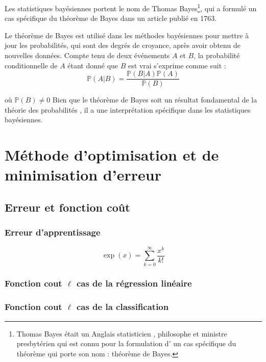 		Les statistiques bayésiennes portent le nom de Thomas Bayes\footnote{Thomas Bayes était un Anglais statisticien , philosophe et ministre presbytérien qui est connu pour la formulation d' un cas spécifique du théorème qui porte son nom : théorème de Bayes.}, qui a formulé un cas spécifique du théorème de Bayes dans un article publié en 1763.
		
		
		
		\begin{thm} Le théorème de Bayes est utilisé dans les méthodes bayésiennes pour mettre à jour les probabilités, qui sont des degrés de croyance, après avoir obtenu de nouvelles données. Compte tenu de deux événements $A$  et $B$, la probabilité conditionnelle de $A$ étant donné que $B$ est vrai s'exprime comme suit  :
			\begin{equation}
				\mathbb{P}(A|B) = \frac{\mathbb{P}(B|A) \mathbb{P}(A)}{\mathbb{P}(B)}
			\end{equation}
			
		\end{thm}
	
		où $\mathbb{P}(B) \ne 0$ Bien que le théorème de Bayes soit un résultat fondamental de la théorie des probabilités , il a une interprétation spécifique dans les statistiques bayésiennes.
		
		
		
	\section{Méthode d'optimisation et de minimisation d'erreur}
	\subsection{Erreur et fonction coût}
		\lipsum[1]
	\subsubsection{Erreur d'apprentissage}
		\lipsum[1]
	
		\[\exp(x)=\sum_{k=0}^{\infty}\frac{x^k}{k!}\]
		\lipsum[4]
	\subsubsection{Fonction cout $\ell$ cas de la régression linéaire}
		\lipsum[1]
	\subsubsection{Fonction cout $\ell$ cas  de la classification}
		\lipsum[1]
	
